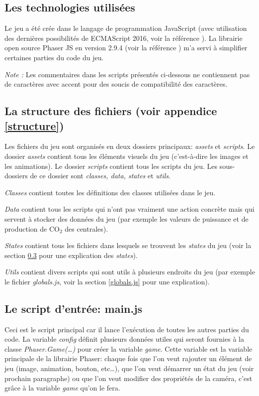 \documentclass{article}
\begin{document}
        \subsection{Les technologies utilisées}
        Le jeu a été crée dans le langage de programmation JavaScript (avec utilisation des dernières possibilités de ECMAScript 2016, voir la référence \cite{ecma2016}). La librairie open source Phaser JS en version 2.9.4 (voir la référence \cite{phaser}) m'a servi à simplifier certaines parties du code du jeu.
        
        
        \textit{Note : } Les commentaires dans les scripts présentés ci-dessous ne contiennent pas de caractères avec accent pour des soucis de compatibilité des caractères.
        
        
        \subsection{La structure des fichiers (voir appendice \ref{structure})}
        Les fichiers du jeu sont organisés en deux dossiers principaux: \textit{assets} et \textit{scripts}. Le dossier \textit{assets} contient tous les éléments visuels du jeu (c'est-à-dire les images et les animations). Le dossier \textit{scripts} contient tous les scripts du jeu. Les sous-dossiers de ce dossier sont \textit{classes, data, states} et \textit{utils}.
        
        
         \textit{Classes} contient toutes les définitions des classes utilisées dans le jeu. 
         
         
         \textit{Data} contient tous les scripts qui n'ont pas vraiment une action concrète mais qui servent à stocker des données du jeu (par exemple les valeurs de puissance et de production de CO$_{2}$ des centrales).
         
         
         \textit{States} contient tous les fichiers dans lesquels se trouvent les \textit{states} du jeu (voir la section \ref{main.js} pour une explication des \textit{states}).
         
         
         \textit{Utils} contient divers scripts qui sont utils à plusieurs endroits du jeu (par exemple le fichier \textit{globals.js}, voir la section \ref{globals.js} pour une explication).
        
       	
		\subsection{Le script d'entrée: main.js} \label{main.js}
		
		Ceci est le script principal car il lance l'exécution de toutes les autres parties du code.
		La variable \textit{config} définit plusieurs données utiles qui seront fournies à la classe \textit{Phaser.Game(\dots)} pour créer la variable \textit{game}. Cette variable est la variable principale de la librairie Phaser: chaque fois que l'on veut rajouter un élément de jeu (image, animation, bouton, etc\dots), que l'on veut démarrer un état du jeu (voir prochain paragraphe) ou que l'on veut modifier des propriétés de la caméra, c'est grâce à la variable \textit{game} qu'on le fera.
		
\end{document}

